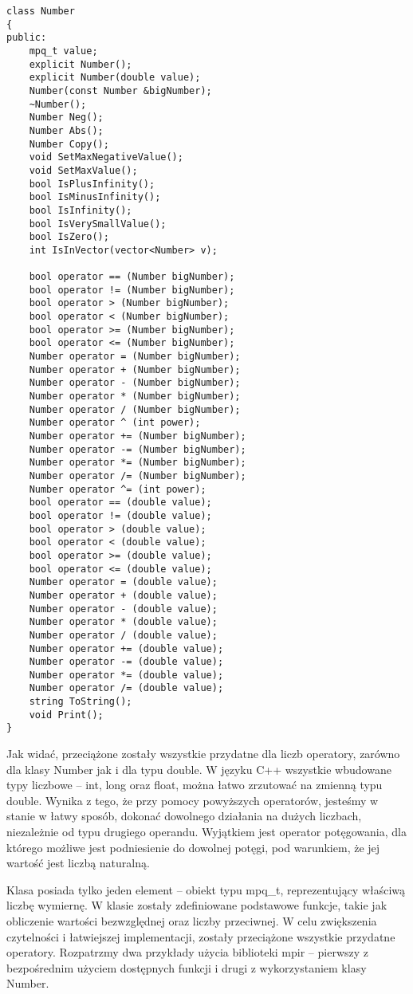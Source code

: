 \documentclass[twoside,a4paper]{book}
\begin{document}
\begin{lstlisting}
class Number
{
public:
	mpq_t value;
	explicit Number();
	explicit Number(double value);
	Number(const Number &bigNumber);
	~Number();
	Number Neg();
	Number Abs();
	Number Copy();
	void SetMaxNegativeValue();
	void SetMaxValue();
	bool IsPlusInfinity();
	bool IsMinusInfinity();
	bool IsInfinity();
	bool IsVerySmallValue();
	bool IsZero();
	int IsInVector(vector<Number> v);
	
	bool operator == (Number bigNumber);
	bool operator != (Number bigNumber);
	bool operator > (Number bigNumber);
	bool operator < (Number bigNumber);
	bool operator >= (Number bigNumber);
	bool operator <= (Number bigNumber);
	Number operator = (Number bigNumber);
	Number operator + (Number bigNumber);
	Number operator - (Number bigNumber);
	Number operator * (Number bigNumber);
	Number operator / (Number bigNumber);
	Number operator ^ (int power);
	Number operator += (Number bigNumber);
	Number operator -= (Number bigNumber);
	Number operator *= (Number bigNumber);
	Number operator /= (Number bigNumber);
	Number operator ^= (int power);
	bool operator == (double value);
	bool operator != (double value);
	bool operator > (double value);
	bool operator < (double value);
	bool operator >= (double value);
	bool operator <= (double value);
	Number operator = (double value);
	Number operator + (double value);
	Number operator - (double value);
	Number operator * (double value);
	Number operator / (double value);
	Number operator += (double value);
	Number operator -= (double value);
	Number operator *= (double value);
	Number operator /= (double value);
	string ToString();
	void Print();
}
\end{lstlisting}

Jak widać, przeciążone zostały wszystkie przydatne dla liczb operatory, zarówno dla klasy Number jak i dla typu double. W języku C++ wszystkie wbudowane typy liczbowe -- int, long oraz float, można łatwo zrzutować na zmienną typu double. Wynika z tego, że przy pomocy powyższych operatorów, jesteśmy w stanie w łatwy sposób, dokonać dowolnego działania na dużych liczbach, niezależnie od typu drugiego operandu. Wyjątkiem jest operator potęgowania, dla którego możliwe jest podniesienie do dowolnej potęgi, pod warunkiem, że jej wartość jest liczbą naturalną.

Klasa posiada tylko jeden element – obiekt typu mpq\_t, reprezentujący właściwą liczbę wymiernę. W klasie zostały zdefiniowane podstawowe funkcje, takie jak obliczenie wartości bezwzględnej oraz liczby przeciwnej. W celu zwiększenia czytelności i łatwiejszej implementacji, zostały przeciążone wszystkie przydatne operatory. Rozpatrzmy dwa przykłady użycia biblioteki mpir – pierwszy z bezpośrednim użyciem dostępnych funkcji i drugi z wykorzystaniem klasy Number.
\end{document}
